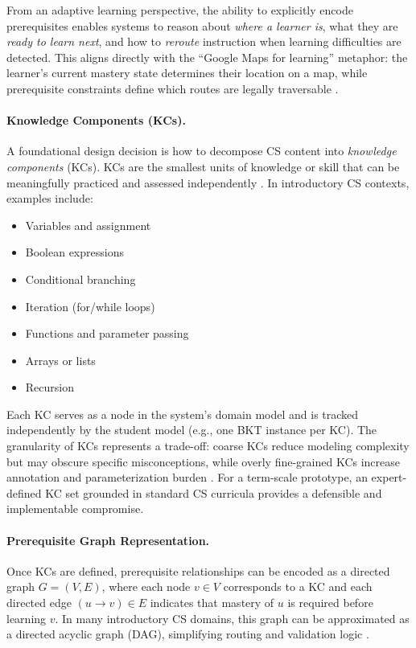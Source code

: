 \documentclass{article}
\begin{document}
From an adaptive learning perspective, the ability to explicitly encode
prerequisites enables systems to reason about \textit{where a learner is}, what
they are \textit{ready to learn next}, and how to \textit{reroute} instruction
when learning difficulties are detected. This aligns directly with the
``Google Maps for learning'' metaphor: the learner’s current mastery state
determines their location on a map, while prerequisite constraints define which
routes are legally traversable \cite{brusilovsky2001}.

\paragraph{Knowledge Components (KCs).}
A foundational design decision is how to decompose CS content into
\textit{knowledge components} (KCs). KCs are the smallest units of knowledge or
skill that can be meaningfully practiced and assessed independently
\cite{koedinger2012}. In introductory CS contexts, examples include:
\begin{itemize}
    \item Variables and assignment
    \item Boolean expressions
    \item Conditional branching
    \item Iteration (for/while loops)
    \item Functions and parameter passing
    \item Arrays or lists
    \item Recursion
\end{itemize}

Each KC serves as a node in the system’s domain model and is tracked independently
by the student model (e.g., one BKT instance per KC). The granularity of KCs
represents a trade-off: coarse KCs reduce modeling complexity but may obscure
specific misconceptions, while overly fine-grained KCs increase annotation and
parameterization burden \cite{koedinger2012,robins2003}. For a term-scale
prototype, an expert-defined KC set grounded in standard CS curricula provides a
defensible and implementable compromise.

\paragraph{Prerequisite Graph Representation.}
Once KCs are defined, prerequisite relationships can be encoded as a directed
graph $G = (V, E)$, where each node $v \in V$ corresponds to a KC and each directed
edge $(u \rightarrow v) \in E$ indicates that mastery of $u$ is required before
learning $v$. In many introductory CS domains, this graph can be approximated as
a directed acyclic graph (DAG), simplifying routing and validation logic
\cite{koedinger2012}.
\end{document}
